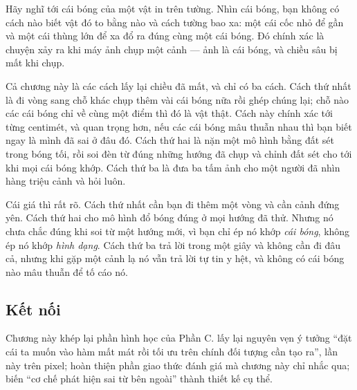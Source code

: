 \documentclass[../../deep_learning.tex]{subfiles}
\begin{document}
\begin{dongian}
Hãy nghĩ tới cái bóng của một vật in trên tường. Nhìn cái bóng, bạn không có cách nào biết vật đó to bằng nào và cách tường bao xa: một cái cốc nhỏ để gần và một cái thùng lớn để xa đổ ra đúng cùng một cái bóng. Đó chính xác là chuyện xảy ra khi máy ảnh chụp một cảnh --- ảnh là cái bóng, và chiều sâu bị mất khi chụp.

Cả chương này là các cách lấy lại chiều đã mất, và chỉ có ba cách. Cách thứ nhất là đi vòng sang chỗ khác chụp thêm vài cái bóng nữa rồi ghép chúng lại; chỗ nào các cái bóng chỉ về cùng một điểm thì đó là vật thật. Cách này chính xác tới từng centimét, và quan trọng hơn, nếu các cái bóng mâu thuẫn nhau thì bạn biết ngay là mình đã sai ở đâu đó. Cách thứ hai là nặn một mô hình bằng đất sét trong bóng tối, rồi soi đèn từ đúng những hướng đã chụp và chỉnh đất sét cho tới khi mọi cái bóng khớp. Cách thứ ba là đưa ba tấm ảnh cho một người đã nhìn hàng triệu cảnh và hỏi luôn.

Cái giá thì rất rõ. Cách thứ nhất cần bạn đi thêm một vòng và cần cảnh đứng yên. Cách thứ hai cho mô hình đổ bóng đúng ở mọi hướng đã thử. Nhưng nó chưa chắc đúng khi soi từ một hướng mới, vì bạn chỉ ép nó khớp \emph{cái bóng}, không ép nó khớp \emph{hình dạng}. Cách thứ ba trả lời trong một giây và không cần đi đâu cả, nhưng khi gặp một cảnh lạ nó vẫn trả lời tự tin y hệt, và không có cái bóng nào mâu thuẫn để tố cáo nó.

\end{dongian}

\subsection*{Kết nối}
Chương này khép lại phần hình học của Phần C.  lấy lại nguyên vẹn ý tưởng ``đặt cái ta muốn vào hàm mất mát rồi tối ưu trên chính đối tượng cần tạo ra'', lần này trên pixel;  hoàn thiện phần giao thức đánh giá mà chương này chỉ nhắc qua;  biến ``cơ chế phát hiện sai từ bên ngoài'' thành thiết kế cụ thể.
\end{document}

